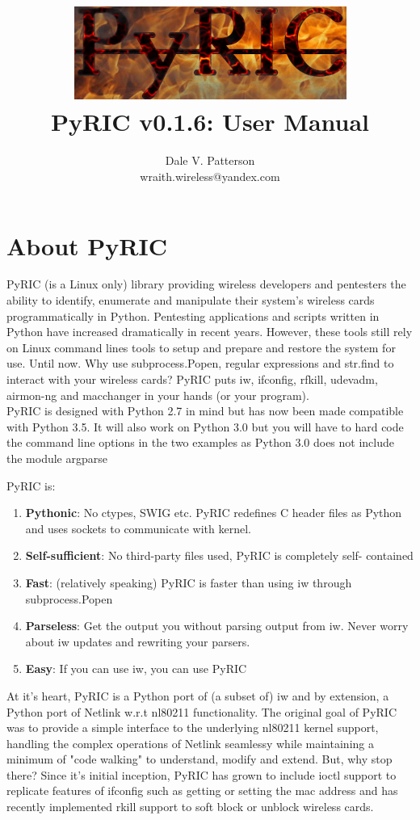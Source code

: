 \documentclass[11pt]{article}
\title{\includegraphics[scale=1]{logo}\\ PyRIC v0.1.6: User Manual}
\author{Dale V. Patterson\\ wraith.wireless@yandex.com}
\begin{document}
\maketitle
\tableofcontents

\section{About PyRIC}\label{sec:About}
PyRIC (is a Linux only) library providing wireless developers and pentesters the
ability to identify, enumerate and manipulate their system's wireless cards
programmatically in Python. Pentesting applications and scripts written in Python
have increased dramatically in recent years. However, these tools still rely on
Linux command lines tools to setup and prepare and restore the system for use.
Until now. Why use subprocess.Popen, regular expressions and str.find to interact
with your wireless cards? PyRIC puts iw, ifconfig, rfkill, udevadm, airmon-ng and 
macchanger in your hands (or your program). \\

PyRIC is designed with Python 2.7 in mind but has now been made compatible with 
Python 3.5. It will also work on Python 3.0 but you will have to hard code the 
command line options in the two examples as Python 3.0 does not include the module 
argparse

PyRIC is:
\begin{enumerate}
\item \textbf{Pythonic}: No ctypes, SWIG etc. PyRIC redefines C header files as 
Python and uses sockets to communicate with kernel.
\item \textbf{Self-sufficient}: No third-party files used, PyRIC is completely self-
contained
\item \textbf{Fast}: (relatively speaking) PyRIC is faster than using iw through 
subprocess.Popen
\item \textbf{Parseless}: Get the output you without parsing output from iw. Never 
worry about iw updates and rewriting your parsers.
\item \textbf{Easy}: If you can use iw, you can use PyRIC
\end{enumerate}

At it's heart, PyRIC is a Python port of (a subset of) iw and by extension, a
Python port of Netlink w.r.t nl80211 functionality. The original goal of PyRIC
was to provide a simple interface to the underlying nl80211 kernel support,
handling the complex operations of Netlink seamlessy while maintaining a minimum
of "code walking" to understand, modify and extend. But, why stop there? Since
it's initial inception, PyRIC has grown to include ioctl support to replicate
features of ifconfig such as getting or setting the mac address and has recently
implemented rkill support to soft block or unblock wireless cards.\\
\end{document}
